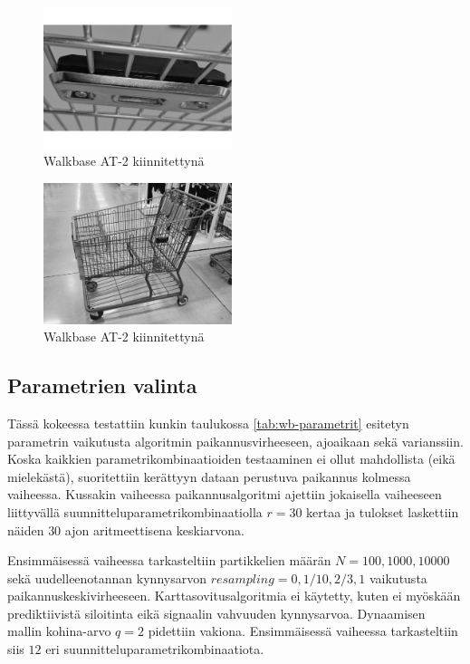 \documentclass[
  12pt,
  a4paper, twoside]{book}
\begin{document}
\newpage

\begin{multicols}{2}
\begin{figure}[H]
\centering
\includegraphics[width=5.5cm]{at_2_cart}
\caption{Walkbase AT-2 kiinnitettynä}
\label{fig:at2_cart}
\end{figure}

\begin{figure}[H]
\centering
\includegraphics[width=5.5cm]{at_2_cart2}
\caption{Walkbase AT-2 kiinnitettynä}
\label{fig:at2_cart2}
\end{figure}
\end{multicols}

\subsection{Parametrien valinta} \label{parametrien-valinta}

Tässä kokeessa testattiin kunkin taulukossa \ref{tab:wb-parametrit} esitetyn parametrin vaikutusta algoritmin paikannusvirheeseen, ajoaikaan sekä varianssiin. Koska kaikkien parametrikombinaatioiden testaaminen ei ollut mahdollista (eikä mielekästä), suoritettiin kerättyyn dataan perustuva paikannus kolmessa vaiheessa. Kussakin vaiheessa paikannusalgoritmi ajettiin jokaisella vaiheeseen liittyvällä suunnitteluparametrikombinaatiolla \(r=30\) kertaa ja tulokset laskettiin näiden \(30\) ajon aritmeettisena keskiarvona.

Ensimmäisessä vaiheessa tarkasteltiin partikkelien määrän \(N={100,1000,10000}\) sekä uudelleenotannan kynnysarvon \(resampling={0,1/10,2/3,1}\) vaikutusta paikannuskeskivirheeseen. Karttasovitusalgoritmia ei käytetty, kuten ei myöskään prediktiivistä siloitinta eikä signaalin vahvuuden kynnysarvoa. Dynaamisen mallin kohina-arvo \(q=2\) pidettiin vakiona. Ensimmäisessä vaiheessa tarkasteltiin siis \(12\) eri suunnitteluparametrikombinaatiota.
\end{document}
